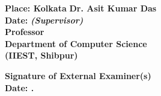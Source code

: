 \begin{flushright}
    \textbf{Place: Kolkata} \hfill \textbf{Dr. Asit Kumar Das}  \\
	\textbf{Date:} \hfill \textit{\textbf{(Supervisor)}} \\
	\textbf{Professor}  \\
	\textbf{Department of Computer Science} \\
	\textbf{(IIEST, Shibpur)} \\
\end{flushright}
\vspace{15mm}
\begin{flushright}
		     \hfill \textbf{Signature of External Examiner(s)} \\
			 \vspace{5mm}
		     \hfill \textbf{Date: \hspace{4.555cm}.}
\end{flushright}

\newpage

